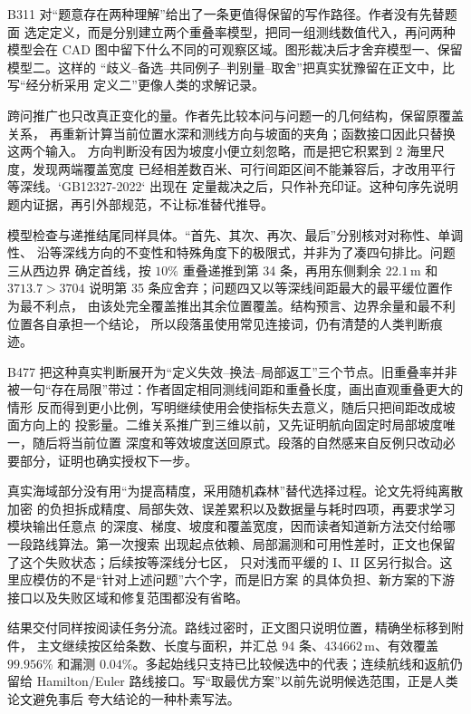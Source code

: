 \documentclass[UTF8,a4paper,12pt]{ctexart}
\begin{document}
B311 对“题意存在两种理解”给出了一条更值得保留的写作路径。作者没有先替题面
选定定义，而是分别建立两个重叠率模型，把同一组测线数值代入，再问两种模型会在
CAD 图中留下什么不同的可观察区域。图形裁决后才舍弃模型一、保留模型二。这样的
“歧义--备选--共同例子--判别量--取舍”把真实犹豫留在正文中，比写“经分析采用
定义二”更像人类的求解记录。

跨问推广也只改真正变化的量。作者先比较本问与问题一的几何结构，保留原覆盖关系，
再重新计算当前位置水深和测线方向与坡面的夹角；函数接口因此只替换这两个输入。
方向判断没有因为坡度小便立刻忽略，而是把它积累到 2 海里尺度，发现两端覆盖宽度
已经相差数百米、可行间距区间不能兼容后，才改用平行等深线。`GB12327-2022` 出现在
定量裁决之后，只作补充印证。这种句序先说明题内证据，再引外部规范，不让标准替代推导。

模型检查与递推结尾同样具体。“首先、其次、再次、最后”分别核对对称性、单调性、
沿等深线方向的不变性和特殊角度下的极限式，并非为了凑四句排比。问题三从西边界
确定首线，按 $10\%$ 重叠递推到第 34 条，再用东侧剩余 $22.1\,\mathrm{m}$ 和
$3713.7>3704$ 说明第 35 条应舍弃；问题四又以等深线间距最大的最平缓位置作为最不利点，
由该处完全覆盖推出其余位置覆盖。结构预言、边界余量和最不利位置各自承担一个结论，
所以段落虽使用常见连接词，仍有清楚的人类判断痕迹。

B477 把这种真实判断展开为“定义失效--换法--局部返工”三个节点。旧重叠率并非
被一句“存在局限”带过：作者固定相同测线间距和重叠长度，画出直观重叠更大的情形
反而得到更小比例，写明继续使用会使指标失去意义，随后只把间距改成坡面方向上的
投影量。二维关系推广到三维以前，又先证明航向固定时局部坡度唯一，随后将当前位置
深度和等效坡度送回原式。段落的自然感来自反例只改动必要部分，证明也确实授权下一步。

真实海域部分没有用“为提高精度，采用随机森林”替代选择过程。论文先将纯离散加密
的负担拆成精度、局部失效、误差累积以及数据量与耗时四项，再要求学习模块输出任意点
的深度、梯度、坡度和覆盖宽度，因而读者知道新方法交付给哪一段路线算法。第一次搜索
出现起点依赖、局部漏测和可用性差时，正文也保留了这个失败状态；后续按等深线分七区，
只对浅而平缓的 I、II 区另行拟合。这里应模仿的不是“针对上述问题”六个字，而是旧方案
的具体负担、新方案的下游接口以及失败区域和修复范围都没有省略。

结果交付同样按阅读任务分流。路线过密时，正文图只说明位置，精确坐标移到附件，
主文继续按区给条数、长度与面积，并汇总 94 条、$434662\,\mathrm{m}$、有效覆盖
$99.956\%$ 和漏测 $0.04\%$。多起始线只支持已比较候选中的代表；连续航线和返航仍留给
Hamilton/Euler 路线接口。写“取最优方案”以前先说明候选范围，正是人类论文避免事后
夸大结论的一种朴素写法。
\end{document}
